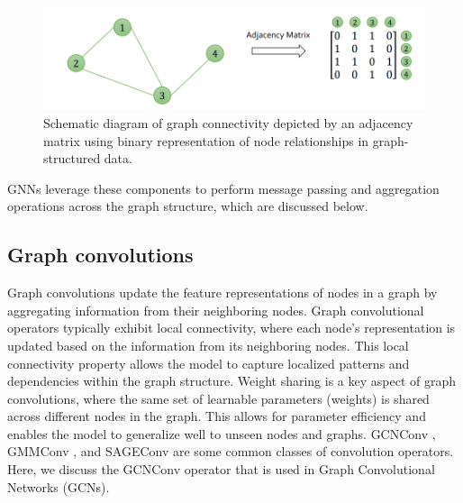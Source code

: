 \begin{figure}[ht]
  \centering
  \includegraphics[width=12cm]{images/Theory-DL/AdjMat.png}
  \caption{Schematic diagram of graph connectivity depicted by an adjacency matrix using binary representation of node relationships in graph-structured data.}
  \label{fig:AdjMat}
\end{figure}
GNNs leverage these components to perform message passing and aggregation operations across the graph structure, which are discussed below. \\
\subsection{Graph convolutions}
Graph convolutions update the feature representations of nodes in a graph by aggregating information from their neighboring nodes. Graph convolutional operators typically exhibit local connectivity, where each node's representation is updated based on the information from its neighboring nodes. This local connectivity property allows the model to capture localized patterns and dependencies within the graph structure. Weight sharing is a key aspect of graph convolutions, where the same set of learnable parameters (weights) is shared across different nodes in the graph. This allows for parameter efficiency and enables the model to generalize well to unseen nodes and graphs. GCNConv \cite{kipf}, GMMConv \cite{MoNet}, and SAGEConv \cite{SAGE} are some common classes of convolution operators. Here, we discuss the GCNConv operator that is used in Graph Convolutional Networks (GCNs).
